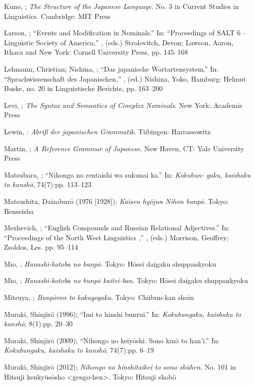 \documentclass[output=paper]{langscibook}
\begin{document}
Kuno, \citet{Susumu1973}; \textit{The Structure of the Japanese Language}. No. 3 in Current Studies in Linguistics. Cambridge: MIT Press 

Larson, \citet{Richard1998}; “Events and Modification in Nominals.” In: “Proceedings of SALT 6 – Linguistic Society of America,” , (eds.) Strolovitch, Devon; Lawson, Aaron, Ithaca and New York: Cornell University Press, pp. 145–168 

Lehmann, Christian; Nishina, \citet{Yoko2015}; “Das japanische Wortartensystem.” In: “Sprachwissenschaft des Japanischen,” , (ed.) Nishina, Yoko, Hamburg: Helmut Buske, no. 20 in Linguistische Berichte, pp. 163–200 

Levi, \citet{Judith1978}; \textit{The Syntax and Semantics of Complex Nominals}. New York: Academic Press

Lewin, \citet{Bruno2003}: \textit{Abriß der japanischen Grammatik}. Tübingen: Harrassowitz

Martin, \citet{Samuel1975}; \textit{A Reference Grammar of Japanese}. New Haven, CT: Yale University Press 

Matsubara, \citet{Sachiko2009}; “Nihongo no rentaishi wa sukunai ka.” In: \textit{Kokubun- gaku, kaishaku to kanshō}, 74(7):pp. 113–123 

Matsushita, Daizaburō (1976 [1928]); \textit{Kaisen hyōjun Nihon bunpō}. Tokyo: Benseisha 

Mezhevich, \citet{Ilana2002}; “English Compounds and Russian Relational Adjectives.” In: “Proceedings of the North West Linguistics \citealt{Conference2002},” , (eds.) Morrison, Geoffrey; Zsoldos, Les. pp. 95–114 

Mio, \citet{Isago1942}; \textit{Hanashi-kotoba no bunpō}. Tokyo: Hōsei daigaku shuppankyoku 

Mio, \citet{Isago1958}; \textit{Hanashi-kotoba no bunpō kaitei-ban}. Tokyo: Hōsei daigaku shuppankyoku 

Mitsuya, \citet{Shigematsu1932}; \textit{Bunpōron to kokugogaku}. Tokyo: Chūbun-kan shoin 

Muraki, Shinjirō (1996); “Imi to hinshi bunrui.” In: \textit{Kokubungaku, kaishaku to kanshō}, 8(1):pp. 20–30 

Muraki, Shinjirō (2009); “Nihongo no keiyōshi. Sono kinō to han’i.” In: \textit{Kokubungaku, kaishaku to kanshō}, 74(7):pp. 6–19 

Muraki, Shinjirō (2012); \textit{Nihongo no hinshitaikei to sono shūhen}. No. 101 in Hitsuji kenkyūsōsho <gengo-hen>. Tokyo: Hitsuji shobō
\end{document}
